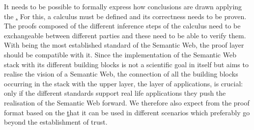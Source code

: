 %
%
%
It needs to be possible to formally express how conclusions are drawn applying the \ul.
For this, a calculus must be defined and its correctness needs to be proven. The proofs composed of the different inference steps of the calculus need to be exchangeable between 
different parties and these need to be able to verify them. With \rdf being the most established standard of the Semantic Web, the proof layer should be compatible with it. 
Since the implementation of the
Semantic Web stack with its different building blocks is not a scientific goal in itself but aims to realise the vision of a Semantic Web, the connection of all the building blocks 
occurring in the stack with the upper layer, the layer of applications, is crucial: only if the different standards support real life applications they push the realisation of the
Semantic Web forward. We therefore also expect from the proof format based on the \ul that it can be used in different scenarios which preferably go beyond the establishment of trust. 
